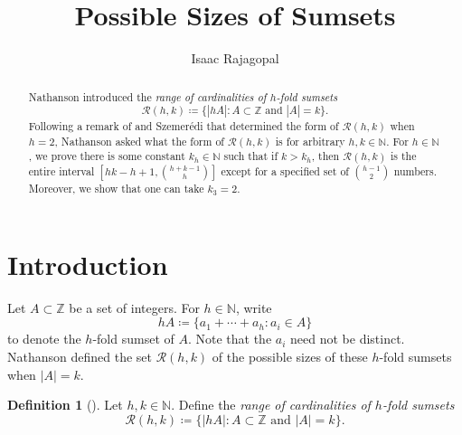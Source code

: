 \documentclass{daj}
\theoremstyle{definition}
\newtheorem{definition}[theorem]{Definition}
\theoremstyle{remark}
\numberwithin{equation}{section}
\numberwithin{theorem}{section}
\newcommand{\N}{\mathbb{N}}
\newcommand{\Z}{\mathbb{Z}}
\newcommand{\calr}{\mathcal{R}}
\begin{document}
\begin{frontmatter}[classification=text]

\title{Possible Sizes of Sumsets} %

\author[isaac]{Isaac Rajagopal}

\begin{abstract}
   Nathanson introduced the \emph{range of cardinalities of $h$-fold sumsets} \[\mathcal{R}(h,k) \coloneq  \{|hA|:A \subset \Z \text{ and }|A| = k\}.\] Following a remark of  and Szemer\'edi that determined the form of $\mathcal{R}(h,k)$ when $h=2$, Nathanson asked what the form of $\mathcal{R}(h,k)$ is for arbitrary $h, k \in \mathbb{N}$. For $h \in \mathbb{N}$, we prove there is some constant $k_h \in \mathbb{N}$ such that if $k > k_h$, then $\mathcal{R}(h,k)$ is the entire interval $\left[hk-h+1,\binom{h+k-1}{h}\right]$ except for a specified set of $\binom{h-1}{2}$ numbers. Moreover, we show that one can take $k_3 = 2$.
\end{abstract}
\end{frontmatter}

\section{Introduction}
Let $A \subset \Z$ be a set of integers. For $h \in \N$, write \[hA \coloneq  \{a_1+\cdots+a_h:a_i \in A\}\] to denote the $h$-fold sumset of $A$. Note that the $a_i$ need not be distinct. Nathanson defined the set $\calr(h,k)$ of the possible sizes of these $h$-fold sumsets when $|A| = k$. 

\begin{definition}[\cite{nathanson25Problems}]
    Let $h, k \in \N$. Define the \emph{range of cardinalities of $h$-fold sumsets } \[\mathcal{R}(h,k) \coloneq  \{|hA| : A \subset \Z \text{ and } |A| = k\}.\]
\end{definition}
\end{document}
